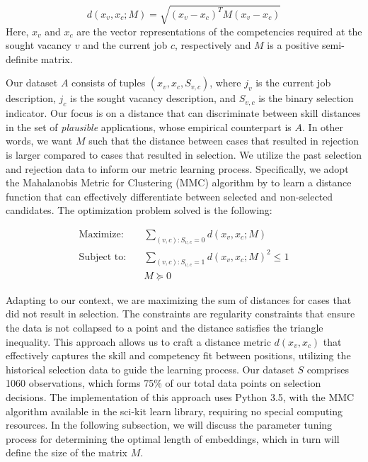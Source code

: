 \begin{equation}
d(x_v, x_c; M) = \sqrt{(x_v - x_c)^T M (x_v - x_c)}
\end{equation}
Here, \(x_v\) and \(x_c\) are the vector representations of the competencies required at the sought vacancy \(v\) and 
the current job \(c\), respectively and $M$ is a positive semi-definite matrix.

Our dataset \(A\) consists of tuples \((x_v, x_c, S_{v,c})\), where \(j_v\) is the current job description, \(j_c\) is 
the sought vacancy description, and \(S_{v,c}\) is the binary selection indicator. Our focus is on a distance that can 
discriminate between skill distances in the set of \textit{plausible} applications, whose empirical counterpart is \(A\). 
In other words, we want \(M\) such that the distance between cases that resulted in rejection is larger compared to cases 
that resulted in selection. We utilize the past selection and rejection data to inform our metric learning process. 
Specifically, we adopt the Mahalanobis Metric for Clustering (MMC) algorithm by \autocite{Xing2002} to learn a distance 
function that can effectively differentiate between selected and non-selected candidates. The optimization problem solved 
is the following: 

\begin{align*}
\text{Maximize:} \quad & \sum_{(v,c): S_{v,c} = 0} d(x_v, x_c; M) \\[1em]
\text{Subject to:} \quad & \sum_{(v,c): S_{v,c} = 1} d(x_v, x_c; M)^2 \leq 1 \\
& M \succeq 0
\end{align*}


Adapting to our context, we are maximizing the sum of distances for cases that did not result in selection. The constraints 
are regularity constraints that ensure the data is not collapsed to a point and the distance satisfies the triangle 
inequality. This approach allows us to craft a distance metric \(d(x_v, x_c)\) that effectively captures the skill and 
competency fit between positions, utilizing the historical selection data to guide the learning process. Our dataset \(S\) 
comprises 1060 observations, which forms 75\% of our total data points on selection decisions. The implementation of this 
approach uses Python 3.5, with the MMC algorithm available in the sci-kit learn library, requiring no special computing 
resources. In the following subsection, we will discuss the parameter tuning process for determining the optimal length of 
embeddings, which in turn will define the size of the matrix \(M\).




